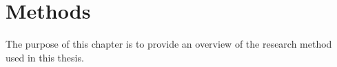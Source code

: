 \documentclass[../main.tex]{subfiles}
\begin{document}
\chapter{Methods}
\label{ch:methods}


The purpose of this chapter is to provide an overview of the research method
used in this thesis. 
\end{document}
